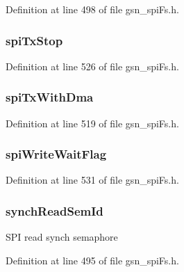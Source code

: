 Definition at line 498 of file gsn\_\-spiFs.h.

\hypertarget{a00232_aace49dfcb18e1db5bc4739a89ecc1ba3}{
\subsubsection[{spiTxStop}]{ {\bf spiTxStop}}}
\label{a00232_aace49dfcb18e1db5bc4739a89ecc1ba3}


Definition at line 526 of file gsn\_\-spiFs.h.

\hypertarget{a00232_a22c3c622b95eb6c2344e62fcd5ebc0bf}{
\subsubsection[{spiTxWithDma}]{ {\bf spiTxWithDma}}}
\label{a00232_a22c3c622b95eb6c2344e62fcd5ebc0bf}


Definition at line 519 of file gsn\_\-spiFs.h.

\hypertarget{a00232_aece15d1c03fade6b2bb0c58ae4d868c1}{
\subsubsection[{spiWriteWaitFlag}]{ {\bf spiWriteWaitFlag}}}
\label{a00232_aece15d1c03fade6b2bb0c58ae4d868c1}


Definition at line 531 of file gsn\_\-spiFs.h.

\hypertarget{a00232_a0ae46c6bc8db30c9e5f95b0db8291410}{
\subsubsection[{synchReadSemId}]{ {\bf synchReadSemId}}}
\label{a00232_a0ae46c6bc8db30c9e5f95b0db8291410}
SPI read synch semaphore 

Definition at line 495 of file gsn\_\-spiFs.h.

